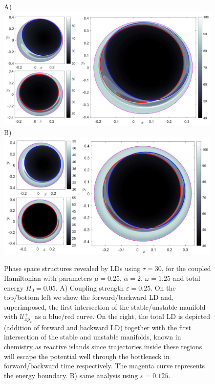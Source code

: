 \documentclass{ws-ijbc}
\begin{document}
\begin{figure}[htbp]
	\begin{center}		
		A)\includegraphics[scale=0.35]{fig13a}
		B)\includegraphics[scale=0.37]{fig13b}
	\end{center}

	\caption{Phase space structures revealed by LDs using $\tau = 30$, for the coupled Hamiltonian with parameters $\mu = 0.25$, $\alpha = 2$, $\omega = 1.25$ and total energy $H_0 = 0.05$. A) Coupling strength $\varepsilon = 0.25$. On the top/bottom left we show the forward/backward LD and, superimposed, the first intersection of the stable/unstable manifold with $\mathcal{U}^{+}_{xp_x}$ as a blue/red curve. On the right, the total LD is depicted (addition of forward and backward LD) together with the first intersection of the stable and unstable manifolds, known in chemistry as reactive islands since trajectories inside these regions will escape the potential well through the bottleneck in forward/backward time respectively. The magenta curve represents the energy boundary. B) same analysis using $\varepsilon = 0.125$.}
	\label{LD_Manifolds}
\end{figure}
\end{document}
